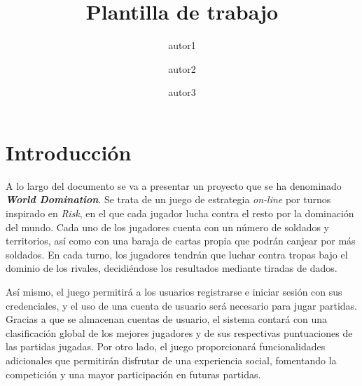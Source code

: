 \documentclass[11pt, a4paper, titlepage]{article}
\title{Plantilla de trabajo}
\author{autor1 \and autor2 \and autor3}
\date{\monthyear}
\begin{document}
\begin{titlepage}

\thispagestyle{empty}


\end{titlepage}
\newpage





\thispagestyle{empty}
\fontsize{11pt}{11pt}\selectfont

\setcounter{tocdepth}{4}

{
    \hypersetup{linkcolor=black}
    \doublespacing
    \tableofcontents
}

\thispagestyle{empty}

\clearpage
\setcounter{page}{1}
\section{Introducción}
A lo largo del documento se va a presentar un proyecto que se ha denominado\textit{ \textbf{World Domination}}. Se trata de un juego de estrategia \textit{on-line} por turnos inspirado en \textit{Risk}, en el que cada jugador lucha contra el resto por la dominación del mundo. Cada uno de los jugadores cuenta con un número de soldados y territorios, así como con una baraja de cartas propia que podrán canjear por más soldados. En cada turno, los jugadores tendrán que luchar contra tropas bajo el dominio de los rivales, decidiéndose los resultados mediante tiradas de dados. \newline


Así mismo, el juego permitirá a los usuarios registrarse e iniciar sesión con sus credenciales, y el uso de una cuenta de usuario será necesario para jugar partidas. Gracias a que se almacenan cuentas de usuario, el sistema contará con una clasificación global de los mejores jugadores y de sus respectivas puntuaciones de las partidas jugadas. Por otro lado, el juego proporcionará funcionalidades adicionales que permitirán disfrutar de una experiencia social, fomentando la competición y una mayor participación en futuras partidas.\\ %
\end{document}
